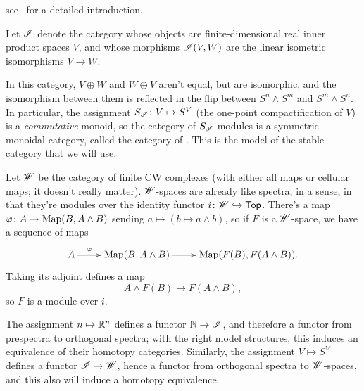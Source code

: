 see~\cite{SchwedeSymmSpec} for a detailed introduction.
\begin{exm}
\label{orthogonal_spectra}
Let $\mathscr I$ denote the category whose objects are finite-dimensional real inner product spaces $V$, and whose
morphisms $\mathscr I(V,W)$ are the linear isometric isomorphisms $V\to W$.

In this category, $V\oplus W$ and $W\oplus V$ aren't equal, but are isomorphic, and the isomorphism between them is
reflected in the flip between $S^n\wedge S^m$ and $S^m\wedge S^n$. In particular, the assignment $S_\sI\colon
V\mapsto S^V$ (the one-point compactification of $V$) is a \emph{commutative} monoid, so the category of
$S_\mathscr I$-modules is a symmetric monoidal category, called the category of . This is the model of the stable category that we will use.
\end{exm}
\begin{exm}
\label{wspaces}
Let $\mathscr W$ be the category of finite CW complexes (with either all maps or cellular maps; it doesn't really matter).
$\mathscr W$-spaces are already like spectra, in a sense, in that they're modules over the identity functor
$i\colon\mathscr W\hookrightarrow\mathsf{Top}$. There's a map $\varphi\colon A\to\operatorname{Map}(B, A\wedge B)$ sending $a\mapsto (b\mapsto a\wedge b)$, so
if $F$ is a $\mathscr W$-space, we have a sequence of maps
\[\xymatrix{
	A\ar[r]^-\vp & \Map(B, A\wedge B)\ar[r] &\Map(F(B), F(A\wedge B)).
}\]
Taking its adjoint defines a map
\[A\wedge F(B)\longrightarrow F(A\wedge B),\]
so $F$ is a module over $i$.
\end{exm}
The assignment $n\mapsto\R^n$ defines a functor $\mathbb N\to\mathscr I$, and therefore a functor from prespectra to orthogonal
spectra; with the right model structures, this induces an equivalence of their homotopy categories. Similarly, the
assignment $V\mapsto S^V$ defines a functor $\mathscr I\to\mathscr W$, hence a functor from orthogonal spectra to $\mathscr W$-spaces,
and this also will induce a homotopy equivalence.
